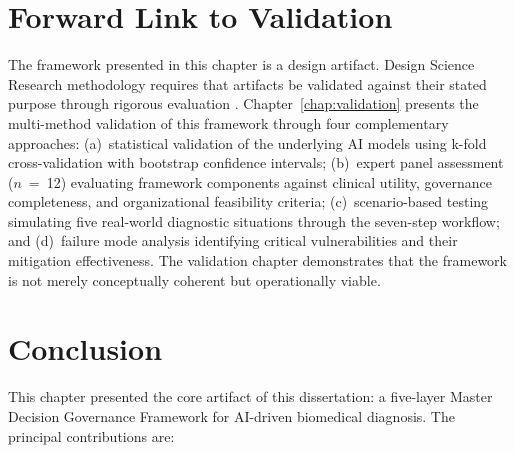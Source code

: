 \section{Forward Link to Validation}
\label{sec:fw_forward}

The framework presented in this chapter is a design artifact. Design Science Research methodology requires that artifacts be validated against their stated purpose through rigorous evaluation \citep{hevner2004design}. Chapter~\ref{chap:validation} presents the multi-method validation of this framework through four complementary approaches: (a)~statistical validation of the underlying AI models using k-fold cross-validation with bootstrap confidence intervals; (b)~expert panel assessment ($n$~=~12) evaluating framework components against clinical utility, governance completeness, and organizational feasibility criteria; (c)~scenario-based testing simulating five real-world diagnostic situations through the seven-step workflow; and (d)~failure mode analysis identifying critical vulnerabilities and their mitigation effectiveness. The validation chapter demonstrates that the framework is not merely conceptually coherent but operationally viable.

\clearpage
\section{Conclusion}
\label{sec:fw_conclusion}

This chapter presented the core artifact of this dissertation: a five-layer Master Decision Governance Framework for AI-driven biomedical diagnosis. The principal contributions are:

